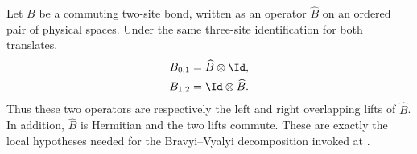 \begin{lemma}
    \label{thm:mpdo_eta_bond_overlapping_lifts}
    \leanok
    Let $B$ be a commuting two-site bond, written as an
    operator $\widehat B$ on an ordered pair of physical spaces.
    Under the same three-site identification for both translates,
    \begin{align}
        B_{0,1}
         & =\widehat B\otimes\Id,
        \notag                    \\
        B_{1,2}
         & =\Id\otimes\widehat B.
        \notag
    \end{align}
    Thus these two operators are respectively the left and right overlapping
    lifts of $\widehat B$. In addition, $\widehat B$ is Hermitian and the two
    lifts commute. These are exactly the local hypotheses needed for the
    Bravyi--Vyalyi decomposition invoked at
    \cite[Appendix~C.2, lines~1599--1605]{Cirac2016MPDO_arXiv}.
\end{lemma}

